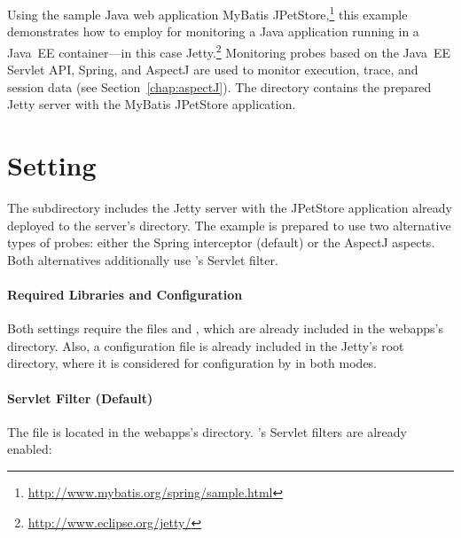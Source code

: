 Using the sample Java web application %
MyBatis JPetStore,\footnote{\url{http://www.mybatis.org/spring/sample.html}} this example %
demonstrates how to employ \KiekerMonitoringPart{} for monitoring a Java application %
running in a Java~EE container---in this case Jetty.\footnote{\url{http://www.eclipse.org/jetty/}} %
Monitoring probes based on the Java~EE Servlet API, Spring, %
and AspectJ are used to monitor execution, trace, and session data (see Section~\ref{chap:aspectJ}). %
The directory \dir{\JavaEEServletExampleDistro/} contains the prepared Jetty %
server with the MyBatis JPetStore application. %

\section{Setting}

The subdirectory  includes the %
Jetty server with the JPetStore application already deployed to the server's %
 directory. The example is prepared to use two alternative %
types of \Kieker{} probes: either the \Kieker{} Spring interceptor (default) or the 
\Kieker{} AspectJ aspects. Both alternatives additionally use \Kieker{}'s Servlet 
filter. %

\paragraph{Required Libraries and \KiekerMonitoringPart{} Configuration}

Both settings require the files \file{\aspectJWeaverJar{}} and \file{\mainJar}, %
which are already included in the webapps's  directory. %
Also, a \Kieker{} configuration file is already included in the Jetty's root directory, %
where it is considered for configuration by \KiekerMonitoringPart{} in both modes. 

\paragraph{Servlet Filter (Default)}

The file  is located in the webapps's %
 directory. \Kieker{}'s Servlet filters are already enabled: 

\setXMLListing


